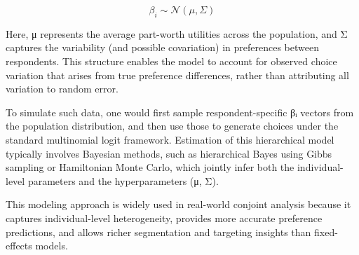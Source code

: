 \documentclass[
  letterpaper,
  DIV=11,
  numbers=noendperiod]{scrartcl}
\begin{document}
\[
\beta_i \sim \mathcal{N}(\mu, \Sigma)
\]

Here, μ represents the average part-worth utilities across the
population, and Σ captures the variability (and possible covariation) in
preferences between respondents. This structure enables the model to
account for observed choice variation that arises from true preference
differences, rather than attributing all variation to random error.

To simulate such data, one would first sample respondent-specific βᵢ
vectors from the population distribution, and then use those to generate
choices under the standard multinomial logit framework. Estimation of
this hierarchical model typically involves Bayesian methods, such as
hierarchical Bayes using Gibbs sampling or Hamiltonian Monte Carlo,
which jointly infer both the individual-level parameters and the
hyperparameters (μ, Σ).

This modeling approach is widely used in real-world conjoint analysis
because it captures individual-level heterogeneity, provides more
accurate preference predictions, and allows richer segmentation and
targeting insights than fixed-effects models.
\end{document}
